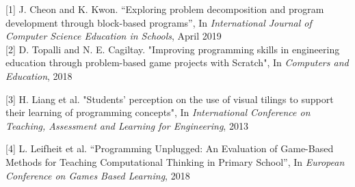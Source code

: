 [1] J. Cheon and K. Kwon. “Exploring problem decomposition and program
development through block-based programs”, In \textit{International Journal of
Computer Science Education in Schools}, April 2019\\

[2] D. Topalli and N. E. Cagiltay. "Improving programming skills in engineering 
education through problem-based game projects with Scratch", In 
\textit{Computers and Education}, 2018

[3] H. Liang et al. "Students' perception on the use of visual tilings to support their
learning of programming concepts", In \textit{International Conference on Teaching, 
Assessment and Learning for Engineering}, 2013

[4] L. Leifheit et al. “Programming Unplugged: An Evaluation of Game-Based
Methods for Teaching Computational Thinking in Primary School”, In
\textit{European Conference on Games Based Learning}, 2018